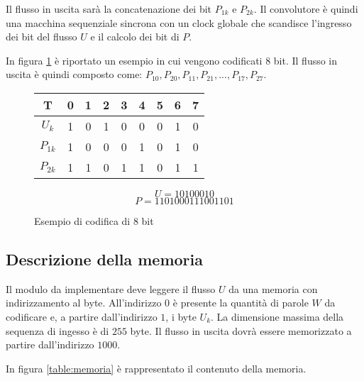 Il flusso in uscita sarà la concatenazione dei bit $P_{1k}$ e $P_{2k}$. Il convolutore è quindi una macchina sequenziale sincrona con un clock globale che scandisce l'ingresso dei bit del flusso $U$ e il calcolo dei bit di $P$.

\newpage

In figura \ref{table:esempio8bit} è riportato un esempio in cui vengono codificati 8 bit. Il flusso in uscita è quindi composto come: $P_{10},P_{20},P_{11},P_{21},...,P_{17},P_{27}$.

\begin{figure}[!ht]
    \centering
    \begin{minipage}{0.4\linewidth}
        \begin{tabular}{c | c | c | c | c | c | c | c | c}
            T        & 0 & 1 & 2 & 3 & 4 & 5 & 6 & 7 \\
            \hline
            $U_k$    & 1 & 0 & 1 & 0 & 0 & 0 & 1 & 0 \\
            $P_{1k}$ & 1 & 0 & 0 & 0 & 1 & 0 & 1 & 0 \\
            $P_{2k}$ & 1 & 1 & 0 & 1 & 1 & 0 & 1 & 1 \\
        \end{tabular}
    \end{minipage}
    \begin{minipage}{0.4\linewidth}
        \begin{equation*}
            U = 10100010
        \end{equation*}
        \begin{equation*}
            P = 1101000111001101
        \end{equation*}
    \end{minipage}
    \caption{Esempio di codifica di 8 bit}
    \label{table:esempio8bit}
\end{figure}

\subsection{Descrizione della memoria}

Il modulo da implementare deve leggere il flusso $U$ da una memoria con indirizzamento al byte. All'indirizzo $0$ è presente la quantità di parole $W$ da codificare e, a partire dall'indirizzo $1$, i byte $U_k$. La dimensione massima della sequenza di ingesso è di $255$ byte. Il flusso in uscita dovrà essere memorizzato a partire dall'indirizzo $1000$.

In figura \ref{table:memoria} è rappresentato il contenuto della memoria.

